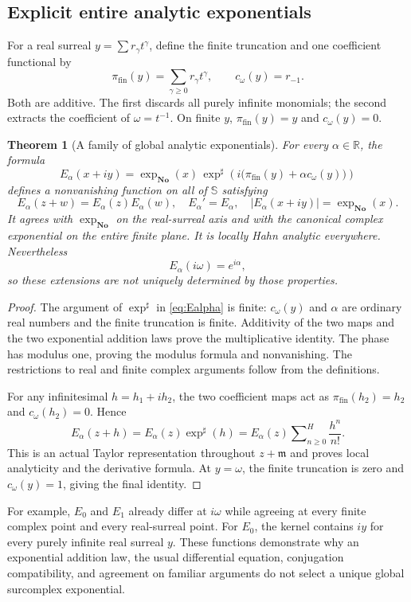 \documentclass[11pt,a4paper]{article}
\newtheorem{theorem}{Theorem}[section]
\theoremstyle{definition}
\theoremstyle{remark}
\newcommand{\No}{\mathbf{No}}
\newcommand{\SC}{\mathbb S}
\newcommand{\R}{\mathbb R}
\newcommand{\mm}{\mathfrak m}
\newcommand{\Hs}{\mathop{\sum}\nolimits^{\!H}}
\begin{document}
\subsection{Explicit entire analytic exponentials}
For a real surreal $y=\sum r_\gamma t^\gamma$, define the finite
truncation and one coefficient functional by
\[
 \pi_{\mathrm{fin}}(y)=\sum_{\gamma\ge0}r_\gamma t^\gamma,
 \qquad c_\omega(y)=r_{-1}.
\]
Both are additive. The first discards all purely infinite monomials;
the second extracts the coefficient of $\omega=t^{-1}$. On finite
$y$, $\pi_{\mathrm{fin}}(y)=y$ and $c_\omega(y)=0$.

\begin{theorem}[A family of global analytic exponentials]\label{thm:exponentials}
For every $\alpha\in\R$, the formula
\begin{equation}\label{eq:Ealpha}
 E_\alpha(x+iy)=\exp_{\No}(x)\,
 \exp^\sharp\!\left(i\bigl(\pi_{\mathrm{fin}}(y)
                            +\alpha c_\omega(y)\bigr)\right)
\end{equation}
defines a nonvanishing function on all of $\SC$ satisfying
\[
 E_\alpha(z+w)=E_\alpha(z)E_\alpha(w),\quad
 E_\alpha'=E_\alpha,\quad
 |E_\alpha(x+iy)|=\exp_{\No}(x).
\]
It agrees with $\exp_{\No}$ on the real-surreal axis and with the
canonical complex exponential on the entire finite plane. It is
locally Hahn analytic everywhere. Nevertheless
\[
 E_\alpha(i\omega)=e^{i\alpha},
\]
so these extensions are not uniquely determined by those properties.
\end{theorem}
\begin{proof}
The argument of $\exp^\sharp$ in \eqref{eq:Ealpha} is finite:
$c_\omega(y)$ and $\alpha$ are ordinary real numbers and the
finite truncation is finite. Additivity of the two maps and the two
exponential addition laws prove the multiplicative identity. The
phase has modulus one, proving the modulus formula and nonvanishing.
The restrictions to real and finite complex arguments follow from
the definitions.

For any infinitesimal $h=h_1+ih_2$, the two coefficient maps act as
$\pi_{\mathrm{fin}}(h_2)=h_2$ and $c_\omega(h_2)=0$. Hence
\[
 E_\alpha(z+h)=E_\alpha(z)\exp^\sharp(h)
       =E_\alpha(z)\Hs_{n\ge0}\frac{h^n}{n!}.
\]
This is an actual Taylor representation throughout $z+\mm$ and
proves local analyticity and the derivative formula. At $y=\omega$,
the finite truncation is zero and $c_\omega(y)=1$, giving the final
identity.
\end{proof}
For example, $E_0$ and $E_1$ already differ at $i\omega$ while
agreeing at every finite complex point and every real-surreal point.
For $E_0$, the kernel contains $iy$ for every purely infinite
real surreal $y$. These functions demonstrate why an
exponential addition law, the usual differential equation, conjugation
compatibility, and agreement on familiar arguments do not select a
unique global surcomplex exponential.
\end{document}
